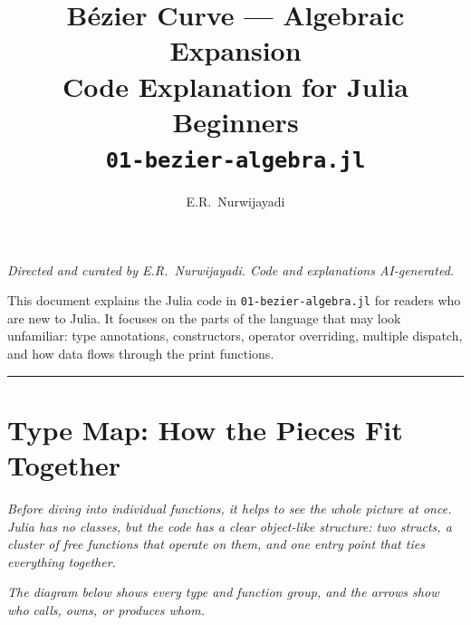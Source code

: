 \documentclass[12pt, a4paper]{article}
\title{%
  \vspace{1cm}
  {\LARGE\bfseries B\'ezier Curve --- Algebraic Expansion}\\[0.4em]
  {\large Code Explanation for Julia Beginners}\\[0.4em]
  {\normalsize\texttt{01-bezier-algebra.jl}}
}
\author{E.R.\ Nurwijayadi}
\date{\DTMtoday}
\newcommand{\cd}[1]{\texttt{#1}}
\newcommand{\docnote}{\textit{Directed and curated by E.R.\ Nurwijayadi.
Code and explanations AI-generated.}}
\begin{document}

\maketitle
\thispagestyle{empty}

\begin{center}\docnote\end{center}

\begin{center}
\begin{minipage}{0.85\textwidth}
\small
This document explains the Julia code in \cd{01-bezier-algebra.jl}
for readers who are new to Julia.
It focuses on the parts of the language that may look unfamiliar:
type annotations, constructors, operator overriding, multiple dispatch,
and how data flows through the print functions.
\end{minipage}
\end{center}

\vspace{1em}\hrule\vspace{1.5em}
\tableofcontents
\newpage


\section{Type Map: How the Pieces Fit Together}

\textit{Before diving into individual functions,
it helps to see the whole picture at once.
Julia has no classes, but the code has a clear object-like structure:
two structs, a cluster of free functions that operate on them,
and one entry point that ties everything together.}

\textit{The diagram below shows every type and function group,
and the arrows show who calls, owns, or produces whom.}

\bigskip

\end{document}
